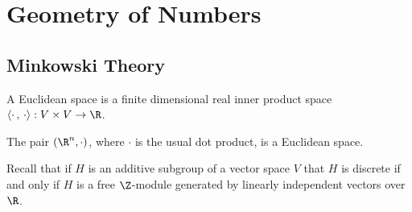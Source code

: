 \section{Geometry of Numbers}
\subsection{Minkowski Theory}

\begin{dfn}
A Euclidean space is a finite dimensional real inner product space $\langle \cdot\,,\,\cdot\rangle: V \times V \to \R$.
\end{dfn}

\begin{ex}
The pair $(\R^n, \cdot)$, where $\cdot$ is the usual dot product, is a Euclidean space. \xqed
\end{ex}

Recall that if $H$ is an additive subgroup of a vector space $V$ that $H$ is discrete if and only if $H$ is a free $\Z$-module generated by linearly independent vectors over $\R$. 

